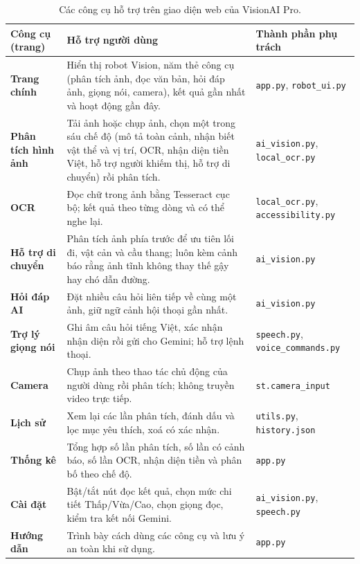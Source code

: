 \begin{table}[H]
\centering
\small\linespread{1.05}\selectfont
\caption{Các công cụ hỗ trợ trên giao diện web của VisionAI Pro.}
\label{tab:congcu-giaodien}
\begin{tabular*}{\textwidth}{@{\extracolsep{\fill}}>{\raggedright\arraybackslash\bfseries\color{daunavy}}p{2.9cm} >{\raggedright\arraybackslash}p{8.3cm} >{\raggedright\arraybackslash}p{3.3cm}}
\toprule
\rowcolor{gray100}
Công cụ (trang) & Hỗ trợ người dùng & Thành phần phụ trách \\
\midrule
Trang chính & Hiển thị robot Vision, năm thẻ công cụ (phân tích ảnh, đọc văn bản, hỏi đáp ảnh, giọng nói, camera), kết quả gần nhất và hoạt động gần đây. & \texttt{app.py}, \texttt{robot\_ui.py} \\
Phân tích hình ảnh & Tải ảnh hoặc chụp ảnh, chọn một trong sáu chế độ (mô tả toàn cảnh, nhận biết vật thể và vị trí, OCR, nhận diện tiền Việt, hỗ trợ người khiếm thị, hỗ trợ di chuyển) rồi phân tích. & \texttt{ai\_vision.py}, \texttt{local\_ocr.py} \\
OCR & Đọc chữ trong ảnh bằng Tesseract cục bộ; kết quả theo từng dòng và có thể nghe lại. & \texttt{local\_ocr.py}, \texttt{accessibility.py} \\
Hỗ trợ di chuyển & Phân tích ảnh phía trước để ưu tiên lối đi, vật cản và cầu thang; luôn kèm cảnh báo rằng ảnh tĩnh không thay thế gậy hay chó dẫn đường. & \texttt{ai\_vision.py} \\
Hỏi đáp AI & Đặt nhiều câu hỏi liên tiếp về cùng một ảnh, giữ ngữ cảnh hội thoại gần nhất. & \texttt{ai\_vision.py} \\
Trợ lý giọng nói & Ghi âm câu hỏi tiếng Việt, xác nhận nhận diện rồi gửi cho Gemini; hỗ trợ lệnh thoại. & \texttt{speech.py}, \texttt{voice\_commands.py} \\
Camera & Chụp ảnh theo thao tác chủ động của người dùng rồi phân tích; không truyền video trực tiếp. & \texttt{st.camera\_input} \\
Lịch sử & Xem lại các lần phân tích, đánh dấu và lọc mục yêu thích, xoá có xác nhận. & \texttt{utils.py}, \texttt{history.json} \\
Thống kê & Tổng hợp số lần phân tích, số lần có cảnh báo, số lần OCR, nhận diện tiền và phân bố theo chế độ. & \texttt{app.py} \\
Cài đặt & Bật/tắt nút đọc kết quả, chọn mức chi tiết Thấp/Vừa/Cao, chọn giọng đọc, kiểm tra kết nối Gemini. & \texttt{ai\_vision.py}, \texttt{speech.py} \\
Hướng dẫn & Trình bày cách dùng các công cụ và lưu ý an toàn khi sử dụng. & \texttt{app.py} \\
\bottomrule
\end{tabular*}
\end{table}

